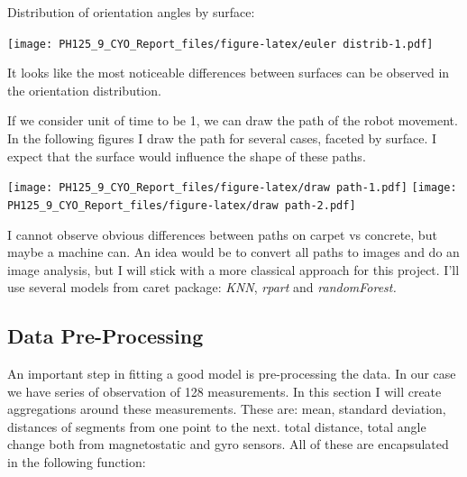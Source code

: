 \documentclass[]{article}
\begin{document}
Distribution of orientation angles by surface:

\texttt{[image: PH125\_9\_CYO\_Report\_files/figure-latex/euler distrib-1.pdf]}

It looks like the most noticeable differences between surfaces can be
observed in the orientation distribution.

If we consider unit of time to be 1, we can draw the path of the robot
movement. In the following figures I draw the path for several cases,
faceted by surface. I expect that the surface would influence the shape
of these paths.

\texttt{[image: PH125\_9\_CYO\_Report\_files/figure-latex/draw path-1.pdf]}
\texttt{[image: PH125\_9\_CYO\_Report\_files/figure-latex/draw path-2.pdf]}

I cannot observe obvious differences between paths on carpet vs
concrete, but maybe a machine can. An idea would be to convert all paths
to images and do an image analysis, but I will stick with a more
classical approach for this project. I'll use several models from caret
package: \emph{KNN}, \emph{rpart} and \emph{randomForest.}

\hypertarget{data-pre-processing}{%
\subsection{Data Pre-Processing}\label{data-pre-processing}}

An important step in fitting a good model is pre-processing the data. In
our case we have series of observation of 128 measurements. In this
section I will create aggregations around these measurements. These are:
mean, standard deviation, distances of segments from one point to the
next. total distance, total angle change both from magnetostatic and
gyro sensors. All of these are encapsulated in the following function:
\end{document}
